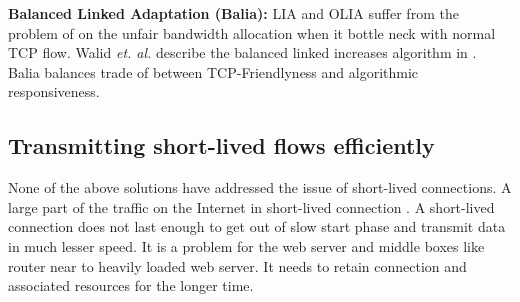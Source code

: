 \textbf{Balanced Linked Adaptation (Balia):}
LIA and OLIA  suffer from the problem of on the unfair bandwidth allocation when it bottle neck with normal TCP flow. Walid \textit{et. al.} describe the balanced linked increases algorithm in \cite{walid2015balanced}. Balia balances trade of between TCP-Friendlyness and algorithmic responsiveness.




\subsection{Transmitting short-lived flows efficiently}

None of the above solutions have addressed the issue of short-lived connections. A large part of the traffic on the Internet in short-lived connection \cite{kheirkhah2015short}. A short-lived connection does not last enough to get out of slow start phase and transmit data in much lesser speed. It is a problem for the web server and middle boxes like router near to heavily loaded web server. It needs to retain connection and associated resources for the longer time. 

